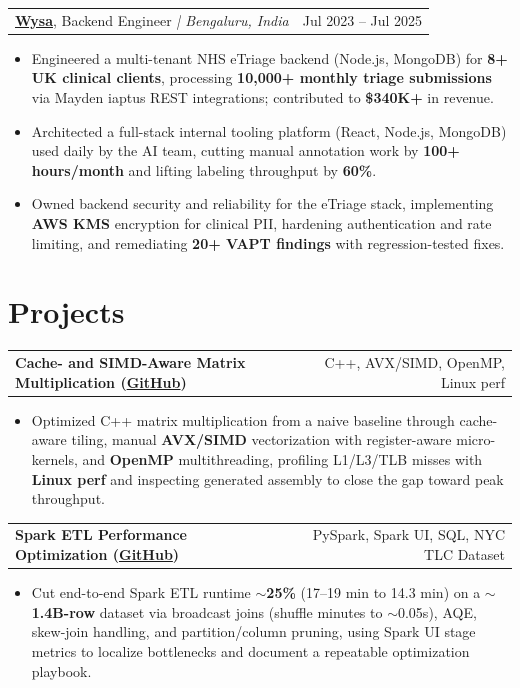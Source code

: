 \documentclass[letterpaper,11pt]{article}
\makeatletter
\newcommand{\expItem}[4]{%
  \vspace{2pt}
  \begin{tabular*}{\textwidth}{@{}l@{\extracolsep{\fill}}r@{}}
    \textbf{#1}, #2 \textit{| #3} & #4 \\
  \end{tabular*}\par\vspace{-3pt}
}
\newcommand{\projItem}[2]{%
  \vspace{2pt}
  \begin{tabular*}{\textwidth}{@{}l@{\extracolsep{\fill}}r@{}}
    \textbf{#1} & #2 \\
  \end{tabular*}\par\vspace{-3pt}
}
\makeatother
\begin{document}
\expItem{\href{https://www.wysa.io}{Wysa}}{Backend Engineer}{Bengaluru, India}{Jul 2023 -- Jul 2025}
\begin{itemize}
  \item Engineered a multi-tenant NHS eTriage backend (Node.js, MongoDB) for \textbf{8+ UK clinical clients}, processing \textbf{10{,}000+ monthly triage submissions} via Mayden iaptus REST integrations; contributed to \textbf{\$340K+} in revenue.
  \item Architected a full-stack internal tooling platform (React, Node.js, MongoDB) used daily by the AI team, cutting manual annotation work by \textbf{100+ hours/month} and lifting labeling throughput by \textbf{60\%}.
  \item Owned backend security and reliability for the eTriage stack, implementing \textbf{AWS KMS} encryption for clinical PII, hardening authentication and rate limiting, and remediating \textbf{20+ VAPT findings} with regression-tested fixes.
\end{itemize}

\section{Projects}

\projItem{Cache- and SIMD-Aware Matrix Multiplication {\normalfont\small(\href{https://github.com/Deva-1903/cs690pf}{GitHub})}}{C++, AVX/SIMD, OpenMP, Linux perf}
\begin{itemize}
  \item Optimized C++ matrix multiplication from a naive baseline through cache-aware tiling, manual \textbf{AVX/SIMD} vectorization with register-aware micro-kernels, and \textbf{OpenMP} multithreading, profiling L1/L3/TLB misses with \textbf{Linux perf} and inspecting generated assembly to close the gap toward peak throughput.
\end{itemize}

\projItem{Spark ETL Performance Optimization {\normalfont\small(\href{https://github.com/Deva-1903/Spark-ETL-Optimization}{GitHub})}}{PySpark, Spark UI, SQL, NYC TLC Dataset}
\begin{itemize}
  \item Cut end-to-end Spark ETL runtime \textbf{$\sim$25\%} (17--19 min to 14.3 min) on a \textbf{$\sim$1.4B-row} dataset via broadcast joins (shuffle minutes to $\sim$0.05s), AQE, skew-join handling, and partition/column pruning, using Spark UI stage metrics to localize bottlenecks and document a repeatable optimization playbook.
\end{itemize}
\end{document}
